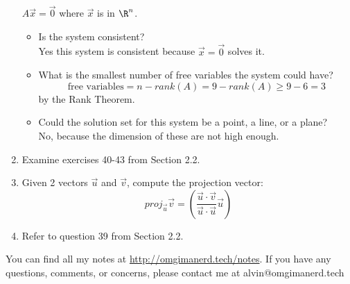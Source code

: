\documentclass{math}
\begin{document}
\begin{enumerate}
    \( A\vec{x} = \vec{0} \) where \( \vec{x} \) is in \( \R^n \).
    \begin{itemize}
      \item Is the system consistent? \\
        Yes this system is consistent because \( \vec{x} = \vec{0} \) solves it.
      \item What is the smallest number of free variables the system could have?
        \[ \text{free variables} = n-rank(A) = 9-rank(A) \ge 9-6 = 3 \]
        by the Rank Theorem.
      \item Could the solution set for this system be a point, a line, or a
        plane? \\
        No, because the dimension of these are not high enough.
    \end{itemize}
  \item Examine exercises 40-43 from Section 2.2.
  \item Given 2 vectors \( \vec{u} \) and \( \vec{v} \), compute the projection
    vector:
    \[ proj_{\vec{u}}\vec{v} =
      (\frac{\vec{u}\cdot\vec{v}}{\vec{u}\cdot\vec{u}}\vec{u}) \]
  \item Refer to question 39 from Section 2.2.
\end{enumerate}

\begin{center}
  You can find all my notes at \url{http://omgimanerd.tech/notes}. If you have
  any questions, comments, or concerns, please contact me at
  alvin@omgimanerd.tech
\end{center}
\end{document}
